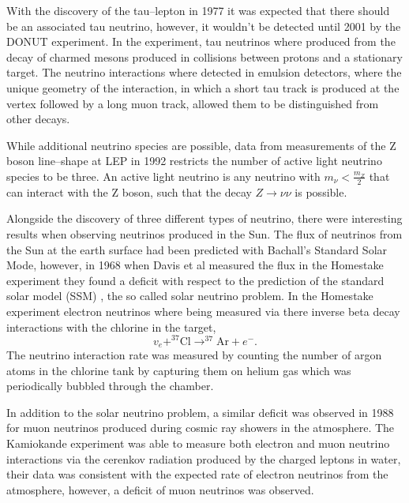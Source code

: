 With the discovery of the tau--lepton in 1977 it was expected that there should 
be an associated tau neutrino, however, it wouldn't be detected until 2001 by 
the DONUT experiment. In the experiment, tau neutrinos where produced from the
decay of charmed mesons produced in collisions between protons and a stationary
target. The neutrino interactions where detected in emulsion detectors, where
the unique geometry of the interaction, in which a short tau track is produced
at the vertex followed by a long muon track, allowed them to be distinguished 
from other decays.

While additional neutrino species are possible, data from measurements of the Z 
boson line--shape at LEP in 1992 restricts the number of active light neutrino 
species to be three. An active light neutrino is any neutrino with \(m_\nu <
\frac{m_Z}{2}\) that can interact with the Z boson, such that the decay \(Z 
\rightarrow \nu \nu \) is possible.

Alongside the discovery of three different types of neutrino, there were
interesting results when observing neutrinos produced in the Sun. The flux of
neutrinos from the Sun at the earth surface had been predicted with Bachall's 
Standard Solar Mode, however, in 1968 when Davis et al measured the flux in the
Homestake experiment they found a deficit with respect to the prediction of the
standard solar model (SSM) \cite{TODO}, the so called solar neutrino problem. In 
the Homestake experiment electron neutrinos where being measured via there 
inverse beta decay interactions with the chlorine in the target,
\begin{equation}
	v_e + ^{37}\mbox{Cl} \rightarrow ^{37}\mbox{Ar} + e^-.
\end{equation}
The neutrino interaction rate was measured by counting the number of argon 
atoms in the chlorine tank by capturing them on helium gas which was
periodically bubbled through the chamber.

In addition to the solar neutrino problem, a similar deficit was observed in
1988 for muon neutrinos produced during cosmic ray showers in the atmosphere.
The Kamiokande experiment was able to measure both electron and muon neutrino 
interactions via the cerenkov radiation produced by the charged leptons in 
water, their data was consistent with the expected rate of electron neutrinos 
from the atmosphere, however, a deficit of muon neutrinos was observed. 


